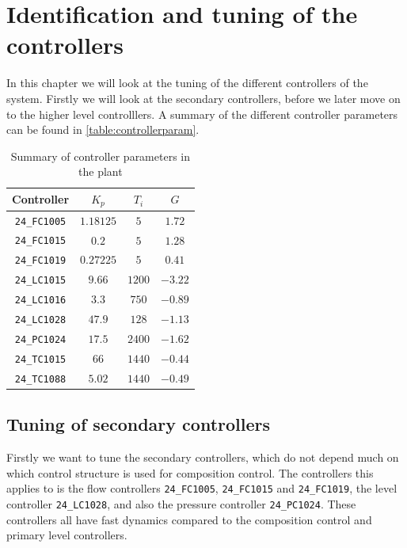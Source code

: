 \chapter{Identification and tuning of the controllers}\label{ch:tuning}
In this chapter we will look at the tuning of the different controllers of the system. Firstly we will look at the secondary controllers, before we later move on to the higher level controlllers. A summary of the different controller parameters can be found in \autoref{table:controllerparam}.

\begin{table}[h]
	\caption{Summary of controller parameters in the plant}
	\label{table:controllerparam}
	\begin{center}
	\begin{tabular}{|c|c|c|c|}
	\hline
	Controller & $K_p$ & $T_i$ & $G$ \\
	\hline
	\texttt{24\_FC1005} & $1.18125$ & $5$ & $1.72$ \\
	\texttt{24\_FC1015} & $0.2$ & $5$ & $1.28$\\
	\texttt{24\_FC1019} & $0.27225$ & $5$ & $0.41$ \\
	\texttt{24\_LC1015} & $9.66$ & $1200$ & $-3.22$ \\
	\texttt{24\_LC1016} & $3.3$ & $750$ & $-0.89$ \\
	\texttt{24\_LC1028} & $47.9$ & $128$ & $-1.13$ \\
	\texttt{24\_PC1024} & $17.5$ & $2400$ & $-1.62$\\
	\texttt{24\_TC1015} & $66$ & $1440$ & $-0.44$\\
	\texttt{24\_TC1088} &$5.02$ & $1440$ & $-0.49$\\
	\hline
	\end{tabular}
	\end{center}
\end{table}

\section{Tuning of secondary controllers}\label{sec:tuning_secondary}
Firstly we want to tune the secondary controllers, which do not depend much on which control structure is used for composition control. The controllers this applies to is the flow controllers \texttt{24\_FC1005}, \texttt{24\_FC1015} and \texttt{24\_FC1019}, the level controller \texttt{24\_LC1028}, and also the pressure controller \texttt{24\_PC1024}. These controllers all have fast dynamics compared to the composition control and primary level controllers.

